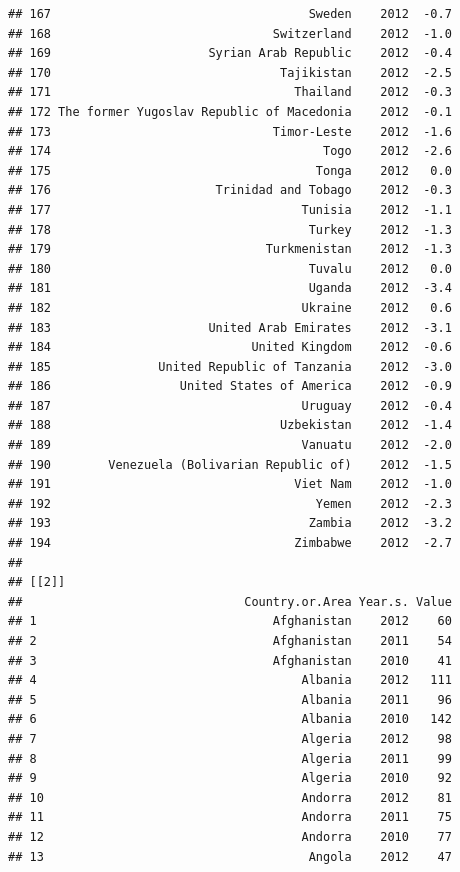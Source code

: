 \documentclass[
]{book}
\begin{document}
\begin{verbatim}
## 167                                    Sweden    2012  -0.7
## 168                               Switzerland    2012  -1.0
## 169                      Syrian Arab Republic    2012  -0.4
## 170                                Tajikistan    2012  -2.5
## 171                                  Thailand    2012  -0.3
## 172 The former Yugoslav Republic of Macedonia    2012  -0.1
## 173                               Timor-Leste    2012  -1.6
## 174                                      Togo    2012  -2.6
## 175                                     Tonga    2012   0.0
## 176                       Trinidad and Tobago    2012  -0.3
## 177                                   Tunisia    2012  -1.1
## 178                                    Turkey    2012  -1.3
## 179                              Turkmenistan    2012  -1.3
## 180                                    Tuvalu    2012   0.0
## 181                                    Uganda    2012  -3.4
## 182                                   Ukraine    2012   0.6
## 183                      United Arab Emirates    2012  -3.1
## 184                            United Kingdom    2012  -0.6
## 185               United Republic of Tanzania    2012  -3.0
## 186                  United States of America    2012  -0.9
## 187                                   Uruguay    2012  -0.4
## 188                                Uzbekistan    2012  -1.4
## 189                                   Vanuatu    2012  -2.0
## 190        Venezuela (Bolivarian Republic of)    2012  -1.5
## 191                                  Viet Nam    2012  -1.0
## 192                                     Yemen    2012  -2.3
## 193                                    Zambia    2012  -3.2
## 194                                  Zimbabwe    2012  -2.7
## 
## [[2]]
##                               Country.or.Area Year.s. Value
## 1                                 Afghanistan    2012    60
## 2                                 Afghanistan    2011    54
## 3                                 Afghanistan    2010    41
## 4                                     Albania    2012   111
## 5                                     Albania    2011    96
## 6                                     Albania    2010   142
## 7                                     Algeria    2012    98
## 8                                     Algeria    2011    99
## 9                                     Algeria    2010    92
## 10                                    Andorra    2012    81
## 11                                    Andorra    2011    75
## 12                                    Andorra    2010    77
## 13                                     Angola    2012    47

\end{verbatim}
\end{document}
